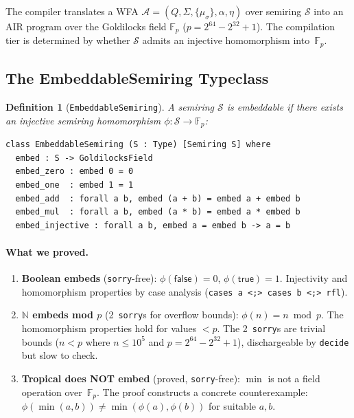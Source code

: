 \documentclass[11pt]{article}
\newtheorem{definition}[theorem]{Definition}
\newcommand{\N}{\mathbb{N}}
\newcommand{\F}{\mathbb{F}}
\newcommand{\semiring}[1]{\mathcal{#1}}
\newcommand{\wfa}{\mathcal{A}}
\newcommand{\sorry}{\texttt{sorry}}
\begin{document}
The compiler translates a WFA
$\wfa = (Q,\Sigma,\{\mu_\sigma\},\alpha,\eta)$ over semiring
$\semiring{S}$ into an AIR program over the Goldilocks field
$\F_p$ ($p=2^{64}-2^{32}+1$).
The compilation tier is determined by whether $\semiring{S}$ admits
an injective homomorphism into~$\F_p$.

\subsection{The EmbeddableSemiring Typeclass}

\begin{definition}[\texttt{EmbeddableSemiring}]\label{def:embeddable}
A semiring $\semiring{S}$ is \emph{embeddable} if there exists an
injective semiring homomorphism $\phi : \semiring{S} \to \F_p$:
\end{definition}

\begin{lstlisting}[language=Lean4,caption={EmbeddableSemiring typeclass.}]
class EmbeddableSemiring (S : Type) [Semiring S] where
  embed : S -> GoldilocksField
  embed_zero : embed 0 = 0
  embed_one  : embed 1 = 1
  embed_add  : forall a b, embed (a + b) = embed a + embed b
  embed_mul  : forall a b, embed (a * b) = embed a * embed b
  embed_injective : forall a b, embed a = embed b -> a = b
\end{lstlisting}

\paragraph{What we proved.}
\begin{enumerate}[nosep,leftmargin=*]
\item \textbf{Boolean embeds} (\sorry{}-free):
  $\phi(\mathsf{false})=0$, $\phi(\mathsf{true})=1$.
  Injectivity and homomorphism properties by case analysis
  (\texttt{cases a <;> cases b <;> rfl}).
\item \textbf{$\N$ embeds mod $p$} (2~\sorry{}s for overflow bounds):
  $\phi(n) = n \bmod p$.
  The homomorphism properties hold for values $< p$.
  The 2~\sorry{}s are trivial bounds ($n < p$ where
  $n \leq 10^5$ and $p = 2^{64}-2^{32}+1$), dischargeable
  by \texttt{decide} but slow to check.
\item \textbf{Tropical does NOT embed} (proved, \sorry{}-free):
  $\min$ is not a field operation over~$\F_p$.
  The proof constructs a concrete counterexample:
  $\phi(\min(a,b)) \neq \min(\phi(a),\phi(b))$ for suitable $a,b$.
\end{enumerate}
\end{document}
